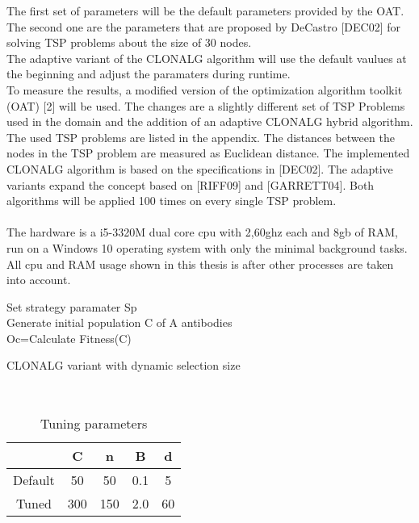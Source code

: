 The first set of parameters will be the default parameters provided by the OAT. The second one are the parameters that are proposed by DeCastro [DEC02] for solving TSP problems about the size of 30 nodes.\\
The adaptive variant of the CLONALG algorithm will use the default vaulues at the beginning and adjust the paramaters during runtime.\\
To measure the results, a modified version of the optimization algorithm toolkit (OAT) [2] will be used. The changes are a slightly different set of TSP Problems used in the domain and the addition of an adaptive CLONALG hybrid algorithm. The used TSP problems are listed in the appendix. The distances between the nodes in the TSP problem are measured as Euclidean distance. The implemented CLONALG algorithm is based on the specifications in [DEC02]. The adaptive variants expand the concept based on [RIFF09] and [GARRETT04].
Both algorithms will be applied 100 times on every single TSP problem.\\\\
The hardware is a i5-3320M dual core cpu with 2,60ghz each and 8gb of RAM, run on a Windows 10 operating system with only the minimal background tasks. All cpu and RAM usage shown in this thesis is after other processes are taken into account.
\begin{algorithm}[b]
	Set strategy paramater Sp\\
	Generate initial population C of A antibodies\\
	Oc=Calculate Fitness(C)\\
	\caption{CLONALG variant with dynamic selection size}
	\label{algo2}
\end{algorithm}\\ 
\begin{table}[p b ]
	\begin{tabular}{|c|c|c|c|c|}
		\hline
		& C   & n   & B   & d  \\ \hline
		Default & 50  & 50  & 0.1 & 5  \\ \hline
		Tuned   & 300 & 150 & 2.0 & 60 \\ \hline
	\end{tabular}
	\caption{Tuning parameters}
	\label{tuning}
\end{table} 
